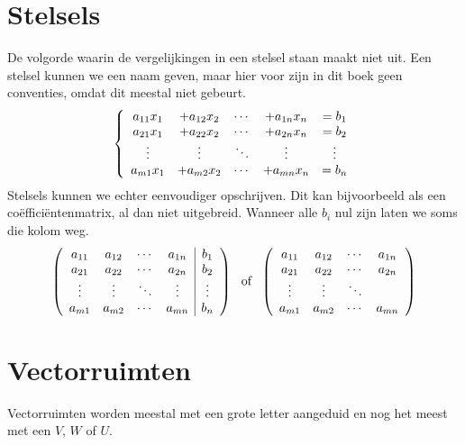 \documentclass[lineaire_algebra_oplossingen.tex]{subfiles}
\begin{document}
\section{Stelsels}
De volgorde waarin de vergelijkingen in een stelsel staan maakt niet uit.
Een stelsel kunnen we een naam geven, maar hier voor zijn in dit boek geen conventies, omdat dit meestal niet gebeurt.
\[
\left\{
\begin{array}{c c c c c}
a_{11}x_{1} &+ a_{12}x_{2} & \cdots &+ a_{1n}x_{n} &= b_1\\
a_{21}x_{1} &+ a_{22}x_{2} & \cdots &+ a_{2n}x_{n} &= b_2\\
\vdots & \vdots & \ddots & \vdots & \vdots \\
a_{m1}x_{1} &+ a_{m2}x_{2} & \cdots &+ a_{mn}x_{n} &= b_n\\
\end{array}
\right.
\]
Stelsels kunnen we echter eenvoudiger opschrijven. Dit kan bijvoorbeeld als een co\"effici\"entenmatrix, al dan niet uitgebreid. Wanneer alle $b_i$ nul zijn laten we soms die kolom weg.
\[
\left(
\begin{array}{c c c c | c}
a_{11} & a_{12} & \cdots & a_{1n} & b_1\\
a_{21} & a_{22} & \cdots & a_{2n} & b_2\\
\vdots & \vdots & \ddots & \vdots & \vdots \\
a_{m1} & a_{m2} & \cdots & a_{mn} & b_n\\
\end{array}
\right)
\ 
\text{ of }
\ 
\left(
\begin{array}{c c c c}
a_{11} & a_{12} & \cdots & a_{1n}\\
a_{21} & a_{22} & \cdots & a_{2n}\\
\vdots & \vdots & \ddots &   \\
a_{m1} & a_{m2} & \cdots & a_{mn}\\
\end{array}
\right)
\]


\section{Vectorruimten}
Vectorruimten worden meestal met een grote letter aangeduid en nog het meest met een $V$, $W$ of $U$.
\end{document}
